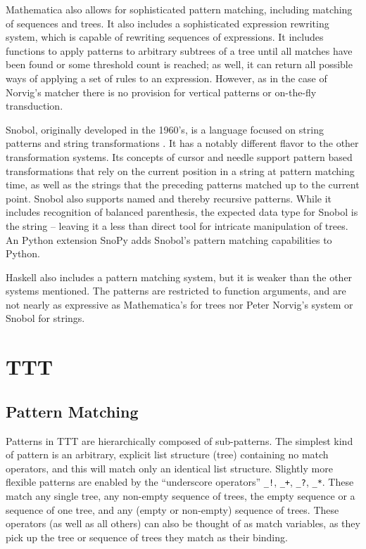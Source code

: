 \documentclass[a4,11pt]{article}
\begin{document}
Mathematica also allows for sophisticated pattern matching, including matching of sequences and trees.  It also includes a sophisticated expression rewriting system, which is capable of rewriting sequences of expressions.  It includes functions to apply patterns to arbitrary subtrees of a tree until all matches have been found or some threshold count is reached; as well, it can return all possible ways of applying a set of rules to an expression. However, as in the case of Norvig's matcher there is no provision for vertical patterns or on-the-fly transduction. \cite{Wolfram:2010}

Snobol, originally developed in the 1960's, is a language focused on string patterns and string transformations \cite{Griswold:1971}.  It has a notably different flavor to the other transformation systems. Its concepts of cursor and needle support pattern based transformations that rely on the current position in a string at pattern matching time, as well as the strings that the preceding patterns matched up to the current point.  Snobol also supports named and thereby recursive patterns.  While it includes recognition of balanced parenthesis, the expected data type for Snobol is the string -- leaving it a less than direct tool for intricate manipulation of trees.  An Python extension SnoPy adds Snobol's pattern matching capabilities to Python.  \cite{Rozenberg:2002}

Haskell also includes a pattern matching system, but it is weaker than the other systems mentioned.  The patterns are restricted to function arguments, and are not nearly as expressive as Mathematica's for trees nor Peter Norvig's system or Snobol for strings. \cite{Hudak:2000}


\section{TTT}
\subsection*{Pattern Matching}
Patterns in TTT are hierarchically composed of sub-patterns. The simplest kind of pattern is an arbitrary, explicit list structure (tree) containing no match operators, and this will match only an identical list structure. Slightly more flexible patterns are enabled by the ``underscore operators'' \texttt{\_!}, \texttt{\_+}, \texttt{\_?}, \texttt{\_*}.  These match any single tree, any non-empty sequence of trees, the empty sequence or a sequence of one tree, and any (empty or non-empty) sequence of trees. These operators (as well as all others) can also be thought of as match variables, as they pick up the tree or sequence of trees they match as their binding. 
\end{document}
